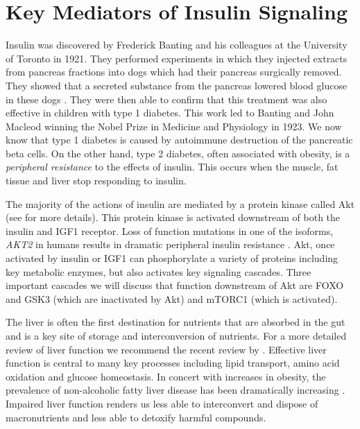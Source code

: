 \documentclass{tufte-handout}
\begin{document}
\section{Key Mediators of Insulin Signaling}

Insulin was discovered by Frederick Banting and his colleagues at the University of Toronto in 1921.  They performed experiments in which they injected extracts from pancreas fractions into dogs which had their pancreas surgically removed.  They showed that a secreted substance from the pancreas lowered blood glucose in these dogs \citep{Banting1922b}.  They were then able to confirm that this treatment was also effective in children with type 1 diabetes.  This work led to Banting and John Macleod winning the Nobel Prize in Medicine and Physiology in 1923.  We now know that type 1 diabetes is caused by autoimmune destruction of the pancreatic beta cells.  On the other hand, type 2 diabetes, often associated with obesity, is a \emph{peripheral resistance} to the effects of insulin.  This occurs when the muscle, fat tissue and liver stop responding to insulin.

The majority of the actions of insulin are mediated by a protein kinase called Akt (see \citep{Manning2007} for more details).  This protein kinase is activated downstream of both the insulin and IGF1 receptor.  Loss of function mutations in one of the isoforms, \textit{AKT2} in humans results in dramatic peripheral insulin resistance \citep{George2004}.  Akt, once activated by insulin or IGF1 can phosphorylate a variety of proteins including key metabolic enzymes, but also activates key signaling cascades.  Three important cascades we will discuss that function downstream of Akt are FOXO and GSK3 (which are inactivated by Akt) and mTORC1 (which is activated).  

  The liver is often the first destination for nutrients that are absorbed in the gut and is a key site of storage and interconversion of nutrients.  For a more detailed review of liver function we recommend the recent review by \citet{Trefts2017}.  Effective liver function is central to many key processes including lipid transport, amino acid oxidation and glucose homeostasis.  In concert with increases in obesity, the prevalence of non-alcoholic fatty liver disease has been dramatically increasing \citep{Hashimoto2011}.  Impaired liver function renders us less able to interconvert and dispose of macronutrients and less able to detoxify harmful compounds.
\end{document}
